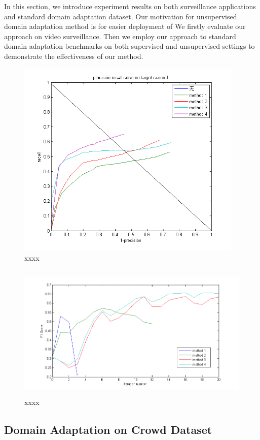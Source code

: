\documentclass[runningheads]{llncs}
\begin{document}
In this section, we introduce experiment results on both surveillance applications and standard domain adaptation dataset. Our motivation for unsupervised domain adaptation method is for easier deployment of  We firstly evaluate our approach on video surveillance. Then we employ our approach to standard domain adaptation benchmarks on both supervised and unsupervised settings to demonstrate the effectiveness of our method.

\begin{figure}
\centering
\includegraphics[height=9.5cm]{images/precisionrecallcurve.png}
\caption{xxxx}
\label{fig:precisionrecallcurve}
\end{figure}

\begin{figure}
\centering
\includegraphics[height=6.5cm]{images/f1score.png}
\caption{xxxx}
\label{fig:precisionrecallcurve}
\end{figure}

\subsection{Domain Adaptation on Crowd Dataset}
\end{document}
